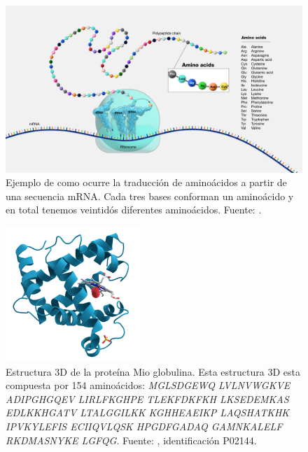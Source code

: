 \begin{figure}[H]
	\centering\includegraphics[width=\textwidth]{../img/proposal/amino-acids}
	\caption[Ejemplo de traducción de aminoácidos]{Ejemplo de como ocurre la traducción de aminoácidos a partir de una secuencia mRNA. Cada tres bases conforman un aminoácido y en total tenemos veintidós diferentes aminoácidos. Fuente: \cite{nih_aminoacids_2024}.}
	\label{fig:aminoacids}
\end{figure}



\begin{figure}[H]
	\centering\includegraphics[width=0.45\textwidth]{../img/proposal/myoglobin}
	\caption[Estructura 3D de la proteína Mio globulina]{Estructura 3D de la proteína Mio globulina. Esta estructura 3D esta compuesta por 154 aminoácidos: \textit{MGLSDGEWQ LVLNVWGKVE ADIPGHGQEV LIRLFKGHPE TLEKFDKFKH LKSEDEMKAS EDLKKHGATV LTALGGILKK KGHHEAEIKP LAQSHATKHK IPVKYLEFIS ECIIQVLQSK HPGDFGADAQ GAMNKALELF RKDMASNYKE LGFQG}. Fuente: \cite{uniprotkb}, identificación P02144.}
	\label{fig:myoglobin}
\end{figure}

